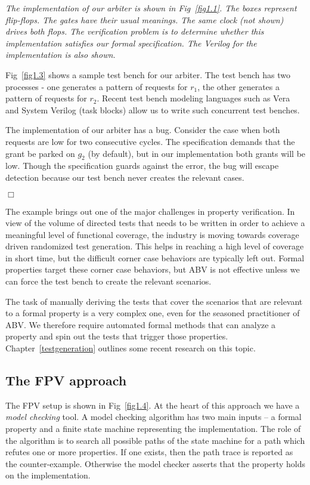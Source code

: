 \begin{example}
{\em 
The implementation of our arbiter is shown in Fig~\ref{fig1.1}. The boxes
represent flip-flops. The gates have their usual meanings. The same clock
(not shown) drives both flops. The verification problem is to determine
whether this implementation satisfies our formal specification. The
Verilog for the implementation is also shown.

Fig~\ref{fig1.3} shows a sample test bench for our arbiter. The test
bench has two processes - one generates a pattern of requests for $r_1$,
the other generates a pattern of requests for $r_2$. Recent test
bench modeling languages such as Vera and System Verilog (task blocks)
allow us to write such concurrent test benches.

The implementation of our arbiter has a bug. Consider the case when both
requests are low for two consecutive cycles. The specification demands that
the grant be parked on $g_2$ (by default), but in our implementation both
grants will be low. Though the specification guards against the error, the
bug will escape detection because our test bench never creates the relevant
cases.
} $\Box$
\end{example}

The example brings out one of the major challenges in property verification.
In view of the volume of directed tests that needs to be written in order to
achieve a meaningful level of functional coverage, the industry is moving
towards coverage driven randomized test generation. This helps in reaching
a high level of coverage in short time, but the difficult corner case
behaviors are typically left out. Formal properties target these
corner case behaviors, but ABV is not effective unless we can force the
test bench to create the relevant scenarios.

The task of manually deriving the tests that cover the scenarios that are
relevant to a formal property is a very complex one, even for the seasoned
practitioner of ABV. We therefore require automated formal methods that
can analyze a property and spin out the tests that trigger those properties.
Chapter~\ref{testgeneration} outlines some recent research on this topic.

\subsection{The FPV approach}
The FPV setup is shown in Fig~\ref{fig1.4}. At the heart of this approach we
have a {\em model checking} tool. A model checking algorithm has two main
inputs -- a formal property and a finite state machine representing the
implementation. The role of the algorithm is to search all possible paths
of the state machine for a path which refutes one or more properties. If one
exists, then the path trace is reported as the counter-example. Otherwise
the model checker asserts that the property holds on the implementation.

